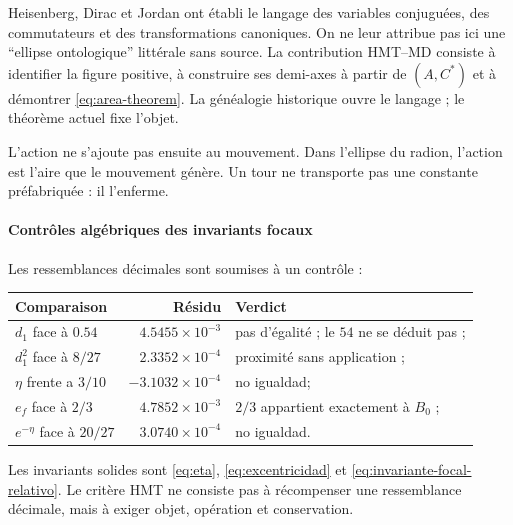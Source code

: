 Heisenberg, Dirac et Jordan ont établi le langage des variables conjuguées,
des commutateurs et des transformations canoniques. On ne leur attribue pas ici une
\enquote{ellipse ontologique} littérale sans source. La contribution HMT--MD consiste à
identifier la figure positive, à construire ses demi-axes à partir de \((A,C^*)\) et à
démontrer \eqref{eq:area-theorem}. La généalogie historique ouvre le langage ;
le théorème actuel fixe l'objet.

\begin{narrativebox}
L'action ne s'ajoute pas ensuite au mouvement. Dans l'ellipse du radion,
l'action est l'aire que le mouvement génère. Un tour ne transporte pas une
constante préfabriquée : il l'enferme.
\end{narrativebox}

\paragraph{Contrôles algébriques des invariants focaux}

Les ressemblances décimales sont soumises à un contrôle :
\begin{center}
\begin{tabularx}{.96\textwidth}{l r X}
\toprule
Comparaison & Résidu & Verdict\\
\midrule
\(d_1\) face à \(0.54\) & \(4.5455\times10^{-3}\) & pas d'égalité ; le \(54\) ne se déduit pas ;\\
\(d_1^2\) face à \(8/27\) & \(2.3352\times10^{-4}\) & proximité sans application ;\\
\(\eta\) frente a \(3/10\) & \(-3.1032\times10^{-4}\) & no igualdad;\\
\(e_f\) face à \(2/3\) & \(4.7852\times10^{-3}\) & \(2/3\) appartient exactement à \(B_0\) ;\\
\(e^{-\eta}\) face à \(20/27\) & \(3.0740\times10^{-4}\) & no igualdad.\\
\bottomrule
\end{tabularx}
\end{center}
Les invariants solides sont \eqref{eq:eta}, \eqref{eq:excentricidad} et
\eqref{eq:invariante-focal-relativo}. Le critère HMT ne consiste pas à récompenser
une ressemblance décimale, mais à exiger objet, opération et conservation.
